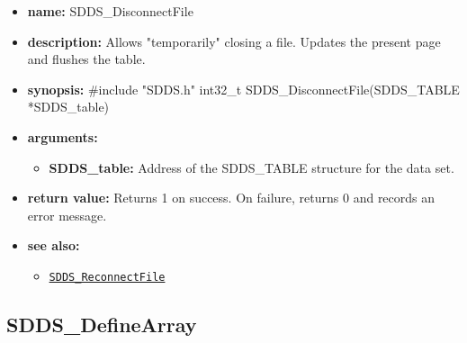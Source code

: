 \documentclass[11pt]{article}
\newcommand{\progref}[1]{\hyperref[SDDS_#1]{\tt SDDS\_#1}}
\begin{document}
\begin{itemize}
\item {\bf name:}\newline
SDDS\_DisconnectFile
\item {\bf description:}\newline
Allows "temporarily" closing a file. Updates the present page and flushes the table.
\item {\bf synopsis:} \#include "SDDS.h"\newline
int32\_t SDDS\_DisconnectFile(SDDS\_TABLE *SDDS\_table)
\item {\bf arguments:}
\begin{itemize}
\item {\bf SDDS\_table:} Address of the SDDS\_TABLE structure for the data set.
\end{itemize}
\item {\bf return value:}\newline
Returns 1 on success. On failure, returns 0 and records an error message.
\item {\bf see also:}
\begin{itemize}
\item \progref{ReconnectFile}
\end{itemize}
\end{itemize}

\subsection{SDDS\_DefineArray}
\label{SDDS_DefineArray}
\end{document}
